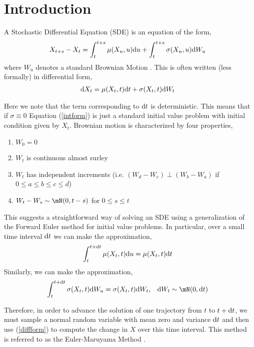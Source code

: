 \documentclass[10pt]{article}
\begin{document}
\maketitle

\section{Introduction}

A Stochastic Differential Equation (SDE) is an equation of the form,
\begin{align}
    X_{t+s} - X_{t} = \int_{t}^{t+s} \mu(X_u,u)\mathrm{d} u + \int_{t}^{t+s} \sigma(X_u,u) \mathrm{d} W_u \label{intform}
\end{align}
where \( W_u \) denotes a standard Brownian Motion \cite{lorig}. This is often written (less formally) in  differential form,
\begin{align}
    \mathrm{d} X_t =  \mu(X_t,t)\mathrm{d} t + \sigma(X_t,t)\mathrm{d} W_t \label{diffform}
\end{align}

Here we note that the term corresponding to \( \mathrm{d} t \) is deterministic. This means that if \( \sigma \equiv 0 \) Equation (\ref{intform}) is just a standard initial value problem with initial condition given by \( X_t \). Brownian motion is characterized by four properties,
\begin{enumerate}[nolistsep]
    \item \( W_0 = 0 \)
    \item \( W_t \) is continuous almost surley
    \item \( W_t \) has independent increments (i.e. \( (W_d-W_c) \perp (W_b-W_a) \)  if \( 0\leq a\leq b\leq c\leq d \))
    \item \( W_t - W_s \sim \mN(0,t-s) \) for \( 0\leq s\leq t \)
\end{enumerate}

This suggests a straightforward way of solving an SDE using a generalization of the Forward Euler method for initial value problems. In particular, over a small time interval \( \mathrm{d} t \) we can make the approximation,
\begin{align*}
    \int_{t}^{t+\mathrm{d} t} \mu(X_t,t)\mathrm{d} u = \mu(X_t,t)\mathrm{d} t
\end{align*}
Similarly, we can make the approximation,
\begin{align*}
    \int_{t}^{t+\d t} \sigma(X_t,t)\d W_u = \sigma(X_t,t)\d W_t, && \d W_t \sim \mN(0,\d t)
\end{align*}

Therefore, in order to advance the solution of one trajectory from \( t \) to \( t+\mathrm{d} t \), we must sample a normal random variable with mean zero and variance \( \mathrm{d} t \) and then use (\ref{diffform}) to compute the change in \( X \) over this time interval. This method is referred to as the Euler-Maruyama Method \cite{sdes}.
\end{document}
